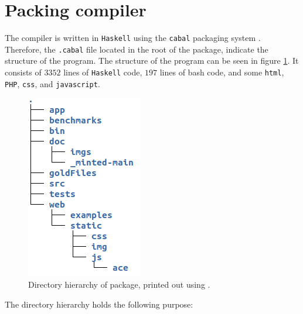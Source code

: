 \section{Packing compiler }
The \lan compiler is written in \texttt{Haskell} using the \texttt{cabal} packaging system
\cite{cabal}. Therefore, the \texttt{.cabal} file located in the root of the package, indicate
the structure of the program. The structure of the program can be seen in figure
\ref{fig:structure}. It consists of $3352$ lines of \texttt{Haskell} code, $197$ lines of
bash code, and some \texttt{html}, \texttt{PHP}, \texttt{css}, and \texttt{javascript}.

\begin{figure}[H]
    \centering
    \includegraphics[scale=0.7]{imgs/directory-structure.png}
    \caption{Directory hierarchy of \lan package, printed out using .}
    \label{fig:structure}
\end{figure}
\noindent
The directory hierarchy holds the following purpose:

